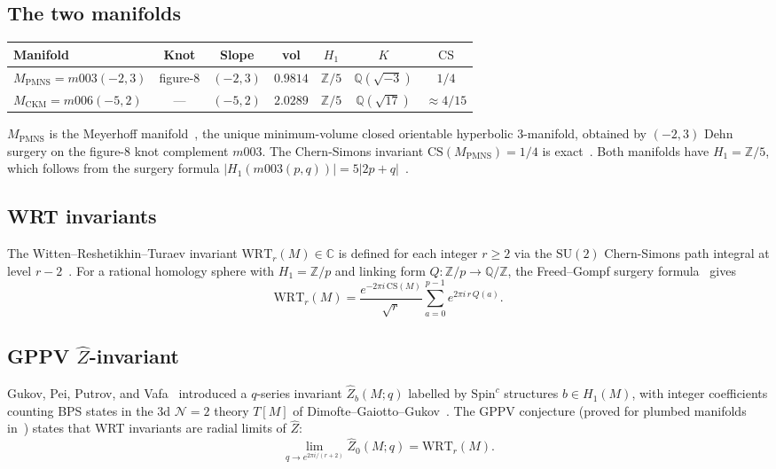 \documentclass[11pt,a4paper]{article}
\theoremstyle{definition}
\newcommand{\MPMNS}{M_{\mathrm{PMNS}}}
\newcommand{\MCKM}{M_{\mathrm{CKM}}}
\newcommand{\ZZ}{\mathbb{Z}}
\newcommand{\QQ}{\mathbb{Q}}
\newcommand{\CC}{\mathbb{C}}
\newcommand{\Zfive}{\mathbb{Z}/5}
\newcommand{\WRT}{\mathrm{WRT}}
\newcommand{\CS}{\mathrm{CS}}
\begin{document}
\subsection{The two manifolds}

\begin{center}
\begin{tabular}{lcccccc}
\toprule
Manifold & Knot & Slope & vol & $H_1$ & $K$ & $\CS$ \\
\midrule
$\MPMNS = m003(-2,3)$ & figure-8 & $(-2,3)$ & $0.9814$ & $\Zfive$
  & $\QQ(\sqrt{-3})$ & $1/4$ \\
$\MCKM = m006(-5,2)$ & --- & $(-5,2)$ & $2.0289$ & $\Zfive$
  & $\QQ(\sqrt{17})$ & $\approx 4/15$ \\
\bottomrule
\end{tabular}
\end{center}

$\MPMNS$ is the Meyerhoff manifold~\cite{GMM}, the unique
minimum-volume closed orientable hyperbolic 3-manifold,
obtained by $(-2,3)$ Dehn surgery on the figure-8 knot
complement $m003$.
The Chern-Simons invariant $\CS(\MPMNS) = 1/4$ is exact~\cite{Meyerhoff87}.
Both manifolds have $H_1 = \Zfive$, which follows from the surgery
formula $|H_1(m003(p,q))| = 5|2p+q|$~\cite{Gentry:Unified}.

\subsection{WRT invariants}

The Witten--Reshetikhin--Turaev invariant $\WRT_r(M) \in \CC$ is defined
for each integer $r \geq 2$ via the $\mathrm{SU}(2)$ Chern-Simons path
integral at level $r-2$~\cite{Witten89,RT91}.
For a rational homology sphere with $H_1 = \ZZ/p$ and linking form
$Q: \ZZ/p \to \QQ/\ZZ$, the Freed--Gompf surgery formula~\cite{FreedGompf91}
gives
\begin{equation}
\WRT_r(M) = \frac{e^{-2\pi i\,\CS(M)}}{\sqrt{r}}
\sum_{a=0}^{p-1} e^{2\pi i\, r\, Q(a)}.
\label{eq:FG}
\end{equation}

\subsection{GPPV $\hat{Z}$-invariant}

Gukov, Pei, Putrov, and Vafa~\cite{GPPV17} introduced a $q$-series
invariant $\hat{Z}_b(M;q)$ labelled by $\mathrm{Spin}^c$ structures
$b \in H_1(M)$, with integer coefficients counting BPS states in the
3d $\mathcal{N}=2$ theory $T[M]$ of Dimofte--Gaiotto--Gukov~\cite{DGG14}.
The GPPV conjecture (proved for plumbed manifolds in~\cite{Murakami23})
states that WRT invariants are radial limits of $\hat{Z}$:
\begin{equation}
\lim_{q \to e^{2\pi i/(r+2)}} \hat{Z}_0(M;q) = \WRT_r(M).
\label{eq:GPPV}
\end{equation}
\end{document}

